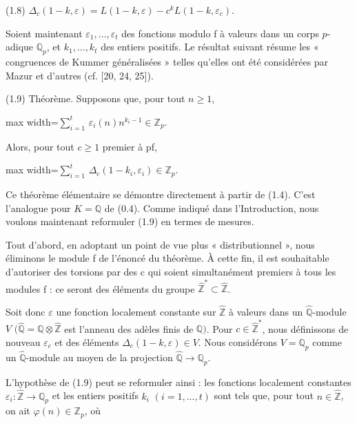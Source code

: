 \documentclass[11pt]{article}
\newcommand{\DFormula}[1]{\par\smallskip\noindent\begin{adjustbox}{max width=\linewidth}$\displaystyle #1$\end{adjustbox}\par\smallskip}
\begin{document}
\par
(1.8)  \(\Delta _{c}(1-k,\varepsilon )=L(1-k,\varepsilon )-c^{k}L(1-k,\varepsilon _{c})\).\par
\par
Soient maintenant \(\varepsilon _{1},...,\varepsilon _{t}\) des fonctions modulo f à valeurs dans un corps \(p\)-adique \(\mathbb{Q}_{p}\), et \(k_{1},...,k_{t}\) des entiers positifs. Le résultat suivant résume les « congruences de Kummer généralisées » telles qu’elles ont été considérées par Mazur et d’autres (cf. [20, 24, 25]).\par
\par
(1.9) Théorème. Supposons que, pour tout \(n\geq 1\),\par
\par
\DFormula{\sum _{i=1}^{t}\,\varepsilon _{i}(n)n^{k_{i}-1}\in \mathbb{Z}_{p}.}
\par
Alors, pour tout \(c\geq 1\) premier à pf,\par
\par
\DFormula{\sum _{i=1}^{t}\,\Delta _{c}(1-k_{i},\varepsilon _{i})\in \mathbb{Z}_{p}.}
\par
Ce théorème élémentaire se démontre directement à partir de (1.4). C’est l’analogue pour \(K=\mathbb{Q}\) de (0.4). Comme indiqué dans l’Introduction, nous voulons maintenant reformuler (1.9) en termes de mesures.\par
\par
Tout d’abord, en adoptant un point de vue plus « distributionnel », nous éliminons le module f de l’énoncé du théorème. À cette fin, il est souhaitable d’autoriser des torsions par des c qui soient simultanément premiers à tous les modules f : ce seront des éléments du groupe \(\widehat{\mathbb{Z}}^{\ast}\subset \widehat{\mathbb{Z}}\).\par
\par
Soit donc \(\varepsilon \) une fonction localement constante sur \(\widehat{\mathbb{Z}}\) à valeurs dans un \(\widehat{\mathbb{Q}}\)-module \(V\) \((\widehat{\mathbb{Q}}=\mathbb{Q}\otimes \widehat{\mathbb{Z}}\) est l’anneau des adèles finis de \(\mathbb{Q})\). Pour \(c\in \widehat{\mathbb{Z}}^{\ast}\), nous définissons de nouveau \(\varepsilon _{c}\) et des éléments \(\Delta _{c}(1-k,\varepsilon )\in V\). Nous considérons \(V=\mathbb{Q}_{p}\) comme un \(\widehat{\mathbb{Q}}\)-module au moyen de la projection \(\widehat{\mathbb{Q}}\to \mathbb{Q}_{p}\).\par
\par
L’hypothèse de (1.9) peut se reformuler ainsi : les fonctions localement constantes \(\varepsilon _{i}:\widehat{\mathbb{Z}}\to \mathbb{Q}_{p}\) et les entiers positifs \(k_{i}\) \((i=1,...,t)\) sont tels que, pour tout \(n\in \widehat{\mathbb{Z}}\), on ait \(\varphi (n)\in \mathbb{Z}_{p}\), où\par
\end{document}
